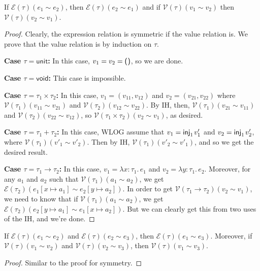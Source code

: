 \documentclass{lecturenotes}
\newcommand{\tabs}[3]{\ensuremath{\lambda #1 \colon #2.\,#3}}
\newcommand{\utype}{\textsf{unit}\xspace}
\newcommand{\unit}{\ensuremath{\textsf{(}\mkern0.5mu\textsf{)}}}
\newcommand{\injl}[1]{\ensuremath{\textsf{inj}_1\mkern2mu#1}}
\newcommand{\vtype}{\textsf{void}\xspace}
\begin{document}
\begin{thm}[Symmetry]
  If $\mathcal{E}(\tau)(e_1 \sim e_2)$, then $\mathcal{E}(\tau)(e_2 \sim e_1)$ and if $\mathcal{V}(\tau)(v_1 \sim v_2)$ then $\mathcal{V}(\tau)(v_2 \sim v_1)$.
\end{thm}
\begin{proof}
  Clearly, the expression relation is symmetric if the value relation is.
  We prove that the value relation is by induction on $\tau$.

  \noindent\textbf{Case $\tau = \utype$:} In this case, $v_1 = v_2 = \unit$, so we are done.

  \noindent\textbf{Case $\tau = \vtype$:} This case is impossible.

  \noindent\textbf{Case $\tau = \tau_1 \times \tau_2$:} In this case, $v_1 = (v_{11}, v_{12})$ and $v_2 = (v_{21}, v_{22})$ where $\mathcal{V}(\tau_1)(v_{11} \sim v_{21})$ and $\mathcal{V}(\tau_2)(v_{12} \sim v_{22})$.
  By IH, then, $\mathcal{V}(\tau_1)(v_{21} \sim v_{11})$ and $\mathcal{V}(\tau_2)(v_{22} \sim v_{12})$, so $\mathcal{V}(\tau_1 \times \tau_2)(v_2 \sim v_1)$, as desired.

  \noindent\textbf{Case $\tau = \tau_1 + \tau_2$:} In this case, WLOG assume that $v_1 = \injl{v'_1}$ and $v_2 = \injl{v'_2}$, where $\mathcal{V}(\tau_1)(v'_1 \sim v'_2)$.
  Then by IH, $\mathcal{V}(\tau_1)(v'_2 \sim v'_1)$, and so we get the desired result.

  \noindent\textbf{Case $\tau = \tau_1 \to \tau_2$:} In this case, $v_1 = \tabs{x}{\tau_1}{e_1}$ and $v_2 = \tabs{y}{\tau_1}{e_2}$.
  Moreover, for any $a_1$ and $a_2$ such that $\mathcal{V}(\tau_1)(a_1 \sim a_2)$, we get $\mathcal{E}(\tau_2)(e_1[x \mapsto a_1] \sim e_2[y \mapsto a_2])$.
  In order to get $\mathcal{V}(\tau_1 \to \tau_2)(v_2 \sim v_1)$, we need to know that if $\mathcal{V}(\tau_1)(a_1 \sim a_2)$, we get $\mathcal{E}(\tau_2)(e_2[y \mapsto a_1] \sim e_1[x \mapsto a_2])$.
  But we can clearly get this from two uses of the IH, and we're done.
\end{proof}

\begin{thm}[Transitivity]
  If $\mathcal{E}(\tau)(e_1 \sim e_2)$ and $\mathcal{E}(\tau)(e_2 \sim e_3)$, then $\mathcal{E}(\tau)(e_1 \sim e_3)$.
  Moreover, if $\mathcal{V}(\tau)(v_1 \sim v_2)$ and $\mathcal{V}(\tau)(v_2 \sim v_3)$, then $\mathcal{V}(\tau)(v_1 \sim v_3)$.
\end{thm}
\begin{proof}
  Similar to the proof for symmetry.
\end{proof}
\end{document}
